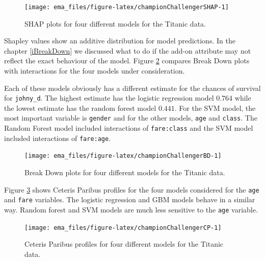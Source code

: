 \documentclass[12pt,]{krantz}
\begin{document}
\begin{figure}

{\centering \texttt{[image: ema\_files/figure-latex/championChallengerSHAP-1]} 

}

\caption{SHAP plots for four different models for the Titanic data.}\label{fig:championChallengerSHAP}
\end{figure}

Shapley values show an additive distribution for model predictions. In the chapter \ref{iBreakDown} we discussed what to do if the add-on attribute may not reflect the exact behaviour of the model.
Figure \ref{fig:championChallengerBD} compares Break Down plots with interactions for the four models under consideration.

Each of these models obviously has a different estimate for the chances of survival for \texttt{johny\_d}. The highest estimate has the logistic regression model \(0.764\) while the lowest estimate has the random forest model \(0.441\). For the SVM model, the most important variable is \texttt{gender} and for the other models, \texttt{age} and \texttt{class}. The Random Forest model included interactions of \texttt{fare:class} and the SVM model included interactions of \texttt{fare:age}.

\begin{figure}

{\centering \texttt{[image: ema\_files/figure-latex/championChallengerBD-1]} 

}

\caption{Break Down plots for four different models for the Titanic data.}\label{fig:championChallengerBD}
\end{figure}

Figure \ref{fig:championChallengerCP} shows Ceteris Paribus profiles for the four models considered for the \texttt{age} and \texttt{fare} variables.
The logistic regression and GBM models behave in a similar way. Random forest and SVM models are much less sensitive to the \texttt{age} variable.

\begin{figure}

{\centering \texttt{[image: ema\_files/figure-latex/championChallengerCP-1]} 

}

\caption{Ceteris Paribus profiles for four different models for the Titanic data.}\label{fig:championChallengerCP}
\end{figure}
\end{document}
